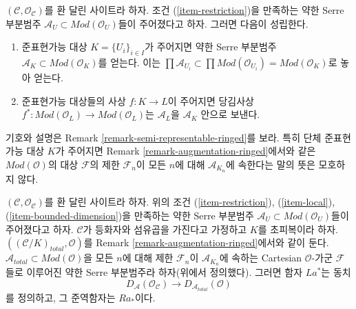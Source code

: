 \noindent
$(\mathcal{C}, \mathcal{O}_\mathcal{C})$를 환 달린 사이트라 하자.
조건 (\ref{item-restriction})을 만족하는 약한 Serre 부분범주
$\mathcal{A}_U \subset \textit{Mod}(\mathcal{O}_U)$들이 주어졌다고 하자.
그러면 다음이 성립한다.
\begin{enumerate}
\item 준표현가능 대상 $K = \{U_i\}_{i \in I}$가 주어지면 약한 Serre 부분범주
$\mathcal{A}_K \subset \textit{Mod}(\mathcal{O}_K)$를 얻는다. 이는
$\prod \mathcal{A}_{U_i} \subset
\prod \textit{Mod}(\mathcal{O}_{U_i}) = \textit{Mod}(\mathcal{O}_K)$로 놓아 얻는다.
\item 준표현가능 대상들의 사상 $f : K \to L$이 주어지면 당김사상
$f^* : \textit{Mod}(\mathcal{O}_L) \to \textit{Mod}(\mathcal{O}_L)$는
$\mathcal{A}_L$을 $\mathcal{A}_K$ 안으로 보낸다.
\end{enumerate}
기호와 설명은 Remark \ref{remark-semi-representable-ringed}를 보라.
특히 단체 준표현가능 대상 $K$가 주어지면 Remark
\ref{remark-augmentation-ringed}에서와 같은
$\textit{Mod}(\mathcal{O})$의 대상 $\mathcal{F}$의 제한
$\mathcal{F}_n$이 모든 $n$에 대해 $\mathcal{A}_{K_n}$에 속한다는
말의 뜻은 모호하지 않다.

\begin{lemma}
\label{lemma-hypercovering-equivalence-modules}
$(\mathcal{C}, \mathcal{O}_\mathcal{C})$를 환 달린 사이트라 하자.
위의 조건 (\ref{item-restriction}), (\ref{item-local}),
(\ref{item-bounded-dimension})을 만족하는 약한 Serre 부분범주
$\mathcal{A}_U \subset \textit{Mod}(\mathcal{O}_U)$들이 주어졌다고 하자.
$\mathcal{C}$가 등화자와 섬유곱을 가진다고 가정하고 $K$를
초피복이라 하자. $((\mathcal{C}/K)_{total}, \mathcal{O})$를 Remark
\ref{remark-augmentation-ringed}에서와 같이 둔다.
$\mathcal{A}_{total} \subset \textit{Mod}(\mathcal{O})$을 모든 $n$에
대해 제한 $\mathcal{F}_n$이 $\mathcal{A}_{K_n}$에 속하는 Cartesian
$\mathcal{O}$-가군 $\mathcal{F}$들로 이루어진 약한 Serre 부분범주라
하자(위에서 정의했다). 그러면 함자 $La^*$는 동치
$$
D_\mathcal{A}(\mathcal{O}_\mathcal{C})
\longrightarrow
D_{\mathcal{A}_{total}}(\mathcal{O})
$$
를 정의하고, 그 준역함자는 $Ra_*$이다.
\end{lemma}

